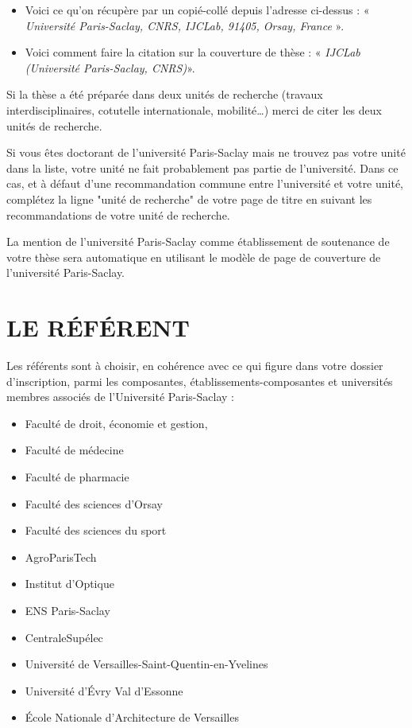 \documentclass[french,12pt,a4paper]{book}
\begin{document}
\begin{itemize}
	\renewcommand{\labelitemi}{$\bullet$}
	\item Voici ce qu’on récupère par un copié-collé depuis l’adresse ci-dessus : « \textit{Université Paris-Saclay, CNRS, IJCLab, 91405, Orsay, France} ».
	\item Voici comment faire la citation sur la couverture de thèse : « \textit{IJCLab (Université Paris-Saclay, CNRS)}».
\end{itemize}


Si la thèse a été préparée dans deux unités de recherche (travaux interdisciplinaires, cotutelle internationale, mobilité…) merci de citer les deux unités de recherche.\\ \par
Si vous êtes doctorant de l'université Paris-Saclay mais ne trouvez pas votre unité dans la liste, votre unité ne fait probablement pas partie de l'université. Dans ce cas, et à défaut d'une recommandation commune entre l'université et votre unité, complétez la ligne "unité de recherche" de votre page de titre en suivant les recommandations de votre unité de recherche.\\ \par
La mention de l'université Paris-Saclay comme établissement de soutenance de votre thèse sera automatique en utilisant le modèle de page de couverture de l'université Paris-Saclay.

\section{LE RÉFÉRENT}
Les référents sont à choisir, en cohérence avec ce qui figure dans votre dossier d’inscription, parmi les composantes, établissements-composantes et universités membres associés de l’Université Paris-Saclay :

\begin{itemize}
	\renewcommand{\labelitemi}{$\bullet$}
	\item Faculté de droit, économie et gestion, 
	\item Faculté de médecine
	\item Faculté de pharmacie
	\item Faculté des sciences d’Orsay
	\item Faculté des sciences du sport 
	\item AgroParisTech
	\item Institut d’Optique
	\item ENS Paris-Saclay
	\item CentraleSupélec
	\item Université de Versailles-Saint-Quentin-en-Yvelines
	\item Université d'Évry Val d’Essonne
	\item École Nationale d’Architecture de Versailles 
\end{itemize}
\end{document}
